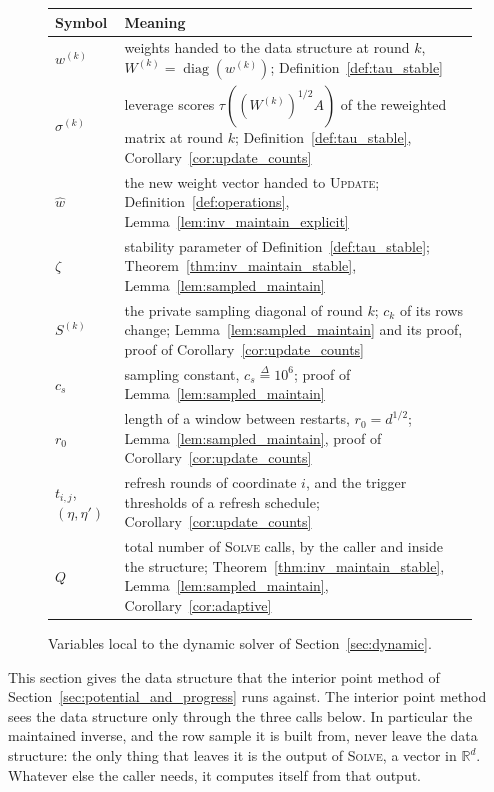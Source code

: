 \documentclass[11pt]{article}
\newcommand{\R}{\mathbb R}
\newcommand{\diag}{\operatorname{diag}}
\newcommand{\what}{\widehat{w}}
\newcommand{\defeq}{\stackrel{\Delta}{=}}
\begin{document}
\begin{figure}[H]
\begin{center}\small
\begin{tabular}{@{}lp{}@{}}
\toprule
Symbol & Meaning \\
\midrule
$w^{(k)}$ & weights handed to the data structure at round $k$, $W^{(k)} = \diag(w^{(k)})$; Definition~\ref{def:tau_stable} \\
$\sigma^{(k)}$ & leverage scores $\tau((W^{(k)})^{1/2}A)$ of the reweighted matrix at round $k$; Definition~\ref{def:tau_stable}, Corollary~\ref{cor:update_counts} \\
$\what$ & the new weight vector handed to \textsc{Update}; Definition~\ref{def:operations}, Lemma~\ref{lem:inv_maintain_explicit} \\
$\zeta$ & stability parameter of Definition~\ref{def:tau_stable}; Theorem~\ref{thm:inv_maintain_stable}, Lemma~\ref{lem:sampled_maintain} \\
$S^{(k)}$ & the private sampling diagonal of round $k$; $c_k$ of its rows change; Lemma~\ref{lem:sampled_maintain} and its proof, proof of Corollary~\ref{cor:update_counts} \\
$c_s$ & sampling constant, $c_s \defeq 10^{6}$; proof of Lemma~\ref{lem:sampled_maintain} \\
$r_0$ & length of a window between restarts, $r_0 = d^{1/2}$; Lemma~\ref{lem:sampled_maintain}, proof of Corollary~\ref{cor:update_counts} \\
$t_{i, j}$, $(\eta, \eta')$ & refresh rounds of coordinate $i$, and the trigger thresholds of a refresh schedule; Corollary~\ref{cor:update_counts} \\
$Q$ & total number of \textsc{Solve} calls, by the caller and inside the structure; Theorem~\ref{thm:inv_maintain_stable}, Lemma~\ref{lem:sampled_maintain}, Corollary~\ref{cor:adaptive} \\
\bottomrule
\end{tabular}
\end{center}
\caption{Variables local to the dynamic solver of Section~\ref{sec:dynamic}.}
\label{fig:notation_dynamic}
\end{figure}

This section gives the data structure that the interior point method of
Section~\ref{sec:potential_and_progress} runs against.
The interior point method sees the data structure only through the three calls
below.
In particular the maintained inverse, and the row sample it is built from, never
leave the data structure: the only thing that leaves it is the output of
\textsc{Solve}, a vector in $\R^{d}$.
Whatever else the caller needs, it computes itself from that output.
\end{document}
